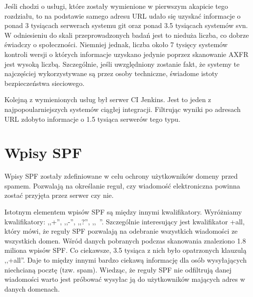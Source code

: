 Jeśli chodzi o usługi, które zostały wymienione w pierwszym akapicie tego rozdziału, to na podstawie samego adresu URL udało się
uzyskać informacje o ponad 3 tysiącach serwerach systemu git oraz ponad 3.5 tysiącach systemów svn. W odniesieniu do skali
przeprowadzonych badań jest to nieduża liczba, co dobrze świadczy o społeczności. Niemniej jednak, liczba około 7 tysięcy systemów
kontroli wersji o których informacje uzyskano jedynie poprzez skanowanie AXFR jest wysoką liczbą. Szczególnie, jeśli uwzględniony
zostanie fakt, że systemy te najczęściej wykorzystywane są przez osoby techniczne, świadome istoty bezpieczeństwa sieciowego.

Kolejną z wymienionych usług był serwer CI Jenkins. Jest to jeden z najpopoularniejszych systemów ciągłej integracji. Filtrując
wyniki po adresach URL zdobyto informacje o 1.5 tysiąca serwerów tego typu.

\section{Wpisy SPF}
Wpisy SPF zostały zdefiniowane w celu ochrony użytkowników domeny przed spamem. Pozwalają na określanie reguł, czy wiadomość
elektroniczna powinna zostać przyjęta przez serwer czy nie.

Istotnym elementem wpisów SPF są między innymi kwalifikatory. Wyróżniamy kwalifikatory: ,,+'', ,,-'', ,,?'', ,,~''. Szczególnie
interesujący jest kwalifikator +all, który mówi, że reguły SPF pozwalają na odebranie wszystkich wiadomości ze wszystkich domen.
Wśród danych pobranych podczas skanowania znaleziono 1.8 miliona wpisów SPF. Co ciekawsze, 3.5 tysiąca z nich było opatrzonych
klauzulą ,,+all''. Daje to między innymi bardzo ciekawą informację dla osób wysyłających niechcianą pocztę (tzw. spam). Wiedząc,
że reguły SPF nie odfiltrują danej wiadomości warto jest próbować wysyłac ją do użytkowników mających adres w danych domenach.
